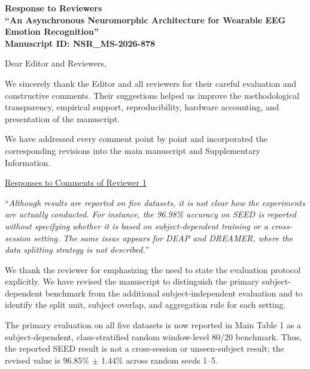 \documentclass[12pt,technote,onecolumn]{IEEEtran}
\begin{document}
\begin{center}
{\large\bfseries Response to Reviewers}\\
{\bfseries ``An Asynchronous Neuromorphic Architecture for Wearable EEG Emotion Recognition''}\\
{\bfseries Manuscript ID: NSR\_MS-2026-878}\\
\end{center}

\vspace{4mm}


Dear Editor and Reviewers,

We sincerely thank the Editor and all reviewers for their careful evaluation and constructive comments. Their suggestions helped us improve the methodological transparency, empirical support, reproducibility, hardware accounting, and presentation of the manuscript.\par\medskip

We have addressed every comment point by point and incorporated the corresponding revisions into the main manuscript and Supplementary Information.

\vspace{6mm}
\begin{center}
\underline{Responses to Comments of Reviewer 1}
\end{center}
\vspace{3mm}

\vspace{4mm}

``{\it Although results are reported on five datasets, it is not clear how the
experiments are actually conducted. For instance, the 96.98\% accuracy
on SEED is reported without specifying whether it is based on
subject-dependent training or a cross-session setting. The same issue
appears for DEAP and DREAMER, where the data splitting strategy is not
described.}''
\vspace{1mm}


We thank the reviewer for emphasizing the need to state the evaluation protocol explicitly. We have revised the manuscript to distinguish the primary subject-dependent benchmark from the additional subject-independent evaluation and to identify the split unit, subject overlap, and aggregation rule for each setting.

The primary evaluation on all five datasets is now reported in Main Table 1 as a
subject-dependent, class-stratified random window-level 80/20 benchmark. Thus,
the reported SEED result is not a cross-session or unseen-subject result; the
revised value is 96.85\% $\pm$ 1.44\% across random seeds 1--5.
\end{document}

